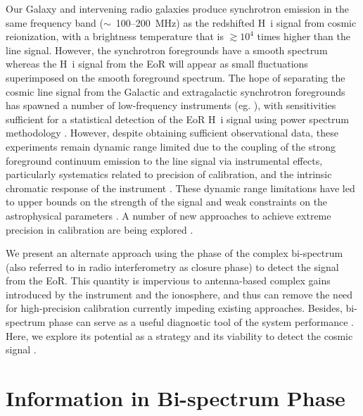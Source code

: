 \documentclass[
reprint,
superscriptaddress,
amsmath,
amssymb,
aps,
prd
]{revtex4-1}
\begin{document}
Our Galaxy and intervening radio galaxies produce synchrotron emission in the same frequency band ($\sim$~100--200~MHz) as the redshifted H~{\sc i} signal from cosmic reionization, with a brightness temperature that is $\gtrsim 10^4$ times higher than the line signal. However, the synchrotron foregrounds have a smooth spectrum whereas the H~{\sc i} signal from the EoR will appear as small fluctuations superimposed on the smooth foreground spectrum. The hope of separating the cosmic line signal from the Galactic and extragalactic synchrotron foregrounds has spawned a number of low-frequency instruments (eg. \cite{par10,tin13,van13}), with sensitivities sufficient for a statistical detection of the EoR H~{\sc i} signal using power spectrum methodology \cite{bea13,thy13}.  However, despite obtaining sufficient observational data, these experiments remain dynamic range limited due to the coupling of the strong foreground continuum emission to the line signal via instrumental effects, particularly systematics related to precision of calibration, and the intrinsic chromatic response of the instrument \cite{barry16,thy15a,thy15b,thy16,dat09,dat10,tro16}. These dynamic range limitations have led to upper bounds on the strength of the signal \cite{pac13,ali15,patil17} and weak constraints on the astrophysical parameters \cite{pob15}. A number of new approaches to achieve extreme precision in calibration are being explored \cite{liu10,zhe14,sie17,dil17}. 

We present an alternate approach using the phase of the complex bi-spectrum (also referred to in radio interferometry as closure phase) to detect the signal from the EoR. This quantity is impervious to antenna-based complex gains introduced by the instrument and the ionosphere, and thus can remove the need for high-precision calibration currently impeding existing approaches. Besides, bi-spectrum phase can serve as a useful diagnostic tool of the system performance \cite[see also companion paper][hereafter referred to as paper I]{car18}. Here, we explore its potential as a strategy and its viability to detect the cosmic signal \cite[see also][]{car16}.

\section{Information in Bi-spectrum Phase}\label{sec:CPinfo}
\end{document}
